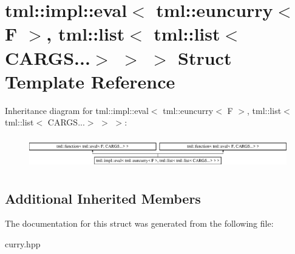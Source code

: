 \hypertarget{structtml_1_1impl_1_1eval_3_01tml_1_1euncurry_3_01F_01_4_00_01tml_1_1list_3_01tml_1_1list_3_01CARGS_8_8_8_4_01_4_01_4}{\section{tml\+:\+:impl\+:\+:eval$<$ tml\+:\+:euncurry$<$ F $>$, tml\+:\+:list$<$ tml\+:\+:list$<$ C\+A\+R\+G\+S...$>$ $>$ $>$ Struct Template Reference}
\label{structtml_1_1impl_1_1eval_3_01tml_1_1euncurry_3_01F_01_4_00_01tml_1_1list_3_01tml_1_1list_3_01CARGS_8_8_8_4_01_4_01_4}
}
Inheritance diagram for tml\+:\+:impl\+:\+:eval$<$ tml\+:\+:euncurry$<$ F $>$, tml\+:\+:list$<$ tml\+:\+:list$<$ C\+A\+R\+G\+S...$>$ $>$ $>$\+:\begin{figure}[H]
\begin{center}
\leavevmode
\includegraphics[height=1.396509cm]{structtml_1_1impl_1_1eval_3_01tml_1_1euncurry_3_01F_01_4_00_01tml_1_1list_3_01tml_1_1list_3_01CARGS_8_8_8_4_01_4_01_4}
\end{center}
\end{figure}
\subsection*{Additional Inherited Members}


The documentation for this struct was generated from the following file\+:\begin{DoxyCompactItemize}
\item 
curry.\+hpp\end{DoxyCompactItemize}
